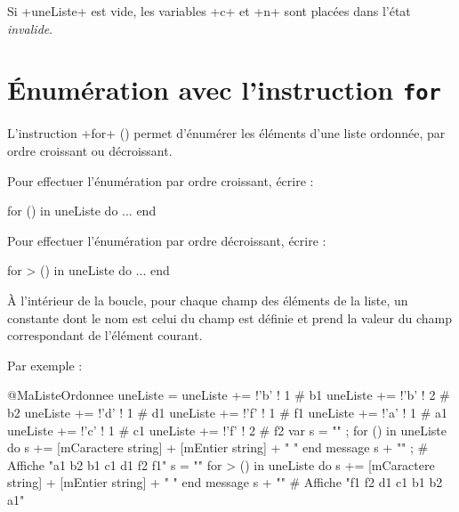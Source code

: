Si \ggs+uneListe+ est vide, les variables \ggs+c+ et \ggs+n+ sont placées dans l'état \emph{invalide}.




\section{Énumération avec l'instruction \texttt{for}}

L'instruction \ggs+for+ () permet d'énumérer les éléments d'une liste ordonnée, par ordre croissant ou décroissant.

Pour effectuer l'énumération par ordre croissant, écrire :
\begin{galgas}
for () in uneListe do
  ...
end
\end{galgas}

Pour effectuer l'énumération par ordre décroissant, écrire :
\begin{galgas}
for > () in uneListe do
  ...
end
\end{galgas}

À l'intérieur de la boucle, pour chaque champ des éléments de la liste, un constante dont le nom est celui du champ est définie et prend la valeur du champ correspondant de l'élément courant.

Par exemple :

\begin{galgas}
@MaListeOrdonnee uneListe = {}
uneListe += !'b' ! 1 # b1
uneListe += !'b' ! 2 # b2
uneListe += !'d' ! 1 # d1
uneListe += !'f' ! 1 # f1
uneListe += !'a' ! 1 # a1
uneListe += !'c' ! 1 # c1
uneListe += !'f' ! 2 # f2
var s = "" ;
for () in uneListe do
  s += [mCaractere string] + [mEntier string] + " "
end
message s + "\n" ; # Affiche "a1 b2 b1 c1 d1 f2 f1"
s = ""
for > () in uneListe do
  s += [mCaractere string] + [mEntier string] + " "
end
message s + "\n" # Affiche "f1 f2 d1 c1 b1 b2 a1"
\end{galgas}
